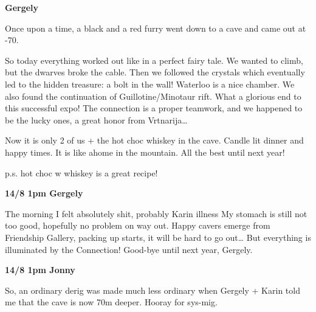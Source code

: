 \textbf{Gergely}

Once upon a time, a black and a red furry went down to a cave and came
out at -70.

So today everything worked out like in a perfect fairy tale. We wanted
to climb, but the dwarves broke the cable. Then we followed the crystals
which eventually led to the hidden treasure: a bolt in the wall!
Waterloo is a nice chamber. We also found the continuation of
Guillotine/Minotaur rift. What a glorious end to this successful expo!
The connection is a proper teamwork, and we happened to be the lucky
ones, a great honor from Vrtnarija\ldots{}

Now it is only 2 of us + the hot choc whiskey in the cave. Candle lit
dinner and happy times. It is like ahome in the mountain. All the best
until next year!

p.s. hot choc w whiskey is a great recipe!

\textbf{14/8 1pm Gergely}

The morning I felt absolutely shit, probably Karin illness My stomach is
still not too good, hopefully no problem on way out. Happy cavers emerge
from Friendship Gallery, packing up starts, it will be hard to go
out\ldots{} But everything is illuminated by the Connection! Good-bye
until next year, Gergely.

\textbf{14/8 1pm Jonny}

So, an ordinary derig was made much less ordinary when Gergely + Karin
told me that the cave is now 70m deeper. Hooray for sys-mig.
